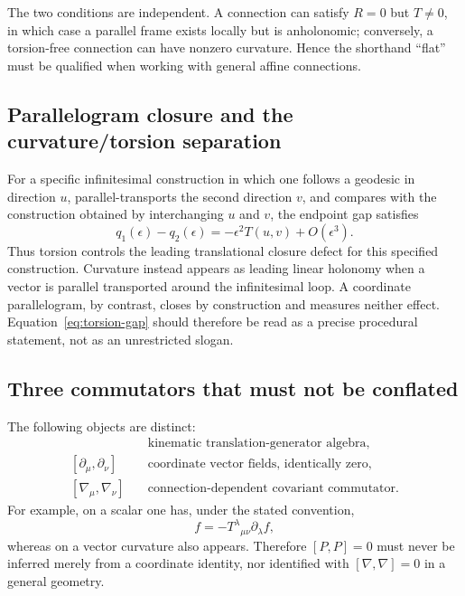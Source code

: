 \documentclass[11pt,a4paper]{article}
\begin{document}
The two conditions are independent.  A connection can satisfy $R=0$ but $T\neq0$, in which case a parallel frame exists locally but is anholonomic; conversely, a torsion-free connection can have nonzero curvature.  Hence the shorthand ``flat'' must be qualified when working with general affine connections.

\subsection{Parallelogram closure and the curvature/torsion separation}
For a specific infinitesimal construction in which one follows a geodesic in direction $u$, parallel-transports the second direction $v$, and compares with the construction obtained by interchanging $u$ and $v$, the endpoint gap satisfies
\begin{equation}
q_1(\epsilon)-q_2(\epsilon)
=-\epsilon^2 T(u,v)+O(\epsilon^3).
\label{eq:torsion-gap}
\end{equation}
Thus torsion controls the leading translational closure defect for this specified construction.  Curvature instead appears as leading linear holonomy when a vector is parallel transported around the infinitesimal loop.  A coordinate parallelogram, by contrast, closes by construction and measures neither effect.  Equation~\eqref{eq:torsion-gap} should therefore be read as a precise procedural statement, not as an unrestricted slogan.

\subsection{Three commutators that must not be conflated}
The following objects are distinct:
\begin{align}
[P_\mu,P_\nu] &\quad\text{kinematic translation-generator algebra},\\
[\partial_\mu,\partial_\nu] &\quad\text{coordinate vector fields, identically zero},\\
[\nabla_\mu,\nabla_\nu] &\quad\text{connection-dependent covariant commutator}.
\end{align}
For example, on a scalar one has, under the stated convention,
\begin{equation}
[\nabla_\mu,\nabla_\nu]f=-T^\lambda{}_{\mu\nu}\partial_\lambda f,
\end{equation}
whereas on a vector curvature also appears.  Therefore $[P,P]=0$ must never be inferred merely from a coordinate identity, nor identified with $[\nabla,\nabla]=0$ in a general geometry.
\end{document}
